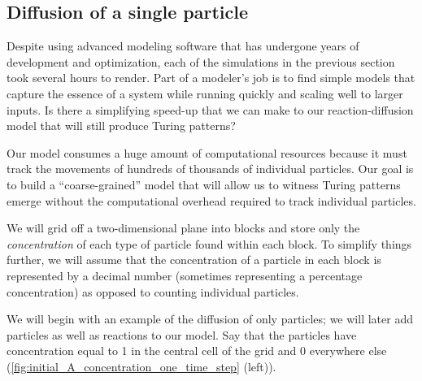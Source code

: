 \subsection{Diffusion of a single particle}

Despite using advanced modeling software that has undergone years of development and optimization, each of the simulations in the previous section took several hours to render. Part of a modeler's job is to find simple models that capture the essence of a system while running quickly and scaling well to larger inputs. Is there a simplifying speed-up that we can make to our reaction-diffusion model that will still produce Turing patterns?

Our model consumes a huge amount of computational resources because it must track the movements of hundreds of thousands of individual particles. Our goal is to build a ``coarse-grained'' model that will allow us to witness Turing patterns emerge without the computational overhead required to track individual particles.

We will grid off a two-dimensional plane into blocks and store only the \textit{concentration} of each type of particle found within each block. To simplify things further, we will assume that the concentration of a particle in each block is represented by a decimal number (sometimes representing a percentage concentration) as opposed to counting individual particles.

We will begin with an example of the diffusion of only  particles; we will later add  particles as well as reactions to our model. Say that the particles have concentration equal to 1 in the central cell of the grid and 0 everywhere else (\autoref{fig:initial_A_concentration_one_time_step} (left)).\\

